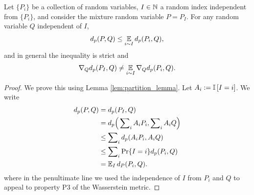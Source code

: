 \documentclass{article}
\begin{document}
\begin{lem}\label{prop:wasserstein_sgd}
Let $\{ P_i \}$ be a collection of random variables, $I \in \mathbb{N}$ a random index independent from $\{ P_i \}$, and consider the mixture random variable $P = P_I$. For any random variable $Q$ independent of $I$,
\begin{equation*}
d_p(P, Q) \le \expect_{i \sim I} d_p(P_i, Q),
\end{equation*}
and in general the inequality is strict and
\begin{equation*}
\nabla_Q d_p(P_I, Q) \ne \expect_{i \sim I} \nabla_Q d_p(P_i, Q) .
\end{equation*}
\end{lem}
\begin{proof}
We prove this using Lemma \ref{lem:partition_lemma}. Let $A_i := \mathbb{I}\left [ I = i \right ]$. We write
\begin{align*}
d_p(P, Q) &= d_p(P_I, Q) \\
&= d_p \Big (\sum\nolimits_i A_i P_i, \sum\nolimits_i A_i Q \Big) \\
&\le \sum\nolimits_i d_p(A_i P_i, A_i Q) \\
&\le \sum\nolimits_i \Pr\{I = i\} d_p(P_i, Q) \\
&= \expect\nolimits_I d_P(P_i, Q) .
\end{align*}
where in the penultimate line we used the independence of $I$ from $P_i$ and $Q$ to appeal to property P3 of the Wasserstein metric.


\end{proof}
\end{document}

